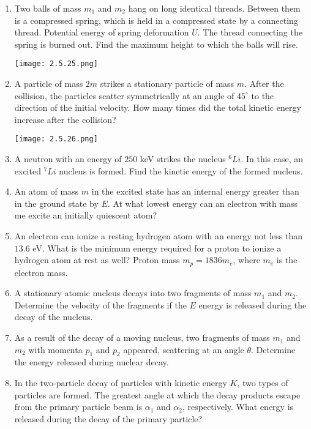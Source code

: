 \documentclass{article}
\begin{document}
\begin{enumerate}[label=2.5.\arabic*]
\item Two balls of mass $m_1$ and $m_2$ hang on long identical threads. Between them is a compressed spring, which is held in a compressed state by a connecting thread. Potential energy of spring deformation $U$. The thread connecting the spring is burned out. Find the maximum height to which the balls will rise.

\begin{center}
    \texttt{[image: 2.5.25.png]}
\end{center}

\item A particle of mass $2m$ strikes a stationary particle of mass $m$. After the collision, the particles scatter symmetrically at an angle of $45^\circ$ to the direction of the initial velocity. How many times did the total kinetic energy increase after the collision?

\begin{center}
    \texttt{[image: 2.5.26.png]}
\end{center}

\item A neutron with an energy of $250$ keV strikes the nucleus ${}^6 Li$. In this case, an excited ${}^7Li$ nucleus is formed. Find the kinetic energy of the formed nucleus.

\item An atom of mass $m$ in the excited state has an internal energy greater than in the ground state by $E$. At what lowest energy can an electron with mass me excite an initially quiescent atom?

\item An electron can ionize a resting hydrogen atom with an energy not less than $13.6$ eV. What is the minimum energy required for a proton to ionize a hydrogen atom at rest as well? Proton mass $m_p = 1836 m_e$, where $m_e$ is the electron mass.

\item A stationary atomic nucleus decays into two fragments of mass $m_1$ and $m_2$. Determine the velocity of the fragments if the $E$ energy is released during the decay of the nucleus.

\item As a result of the decay of a moving nucleus, two fragments of mass $m_1$ and $m_2$ with momenta $p_1$ and $p_2$ appeared, scattering at an angle $\theta$. Determine the energy released during nuclear decay.

\item In the two-particle decay of particles with kinetic energy $K$, two types of particles are formed. The greatest angle at which the decay products escape from the primary particle beam is $\alpha_1$ and $\alpha_2$, respectively. What energy is released during the decay of the primary particle?


\end{enumerate}
\end{document}
